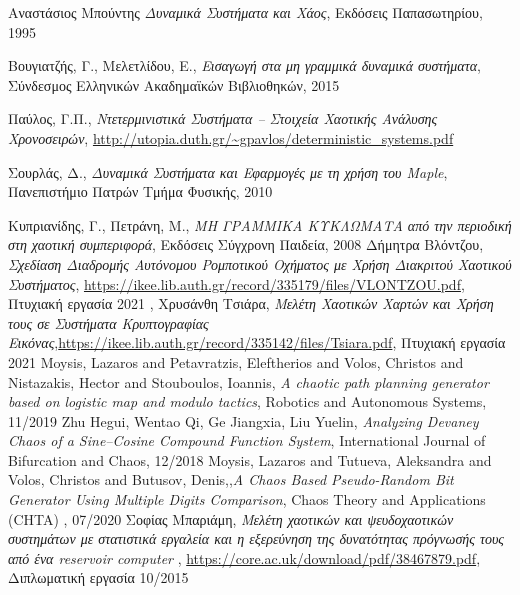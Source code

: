 
\begin{thebibliography}{9}
	Αναστάσιος Μπούντης \emph{Δυναμικά Συστήματα και Χάος}, Εκδόσεις Παπασωτηρίου, 1995
	
	Βουγιατζής, Γ., Μελετλίδου, Ε.,\emph{ Εισαγωγή στα μη γραμμικά δυναμικά συστήματα}, Σύνδεσμος
	Ελληνικών Ακαδημαϊκών Βιβλιοθηκών, 2015
	
	Παύλος, Γ.Π., \emph{Ντετερμινιστικά Συστήματα – Στοιχεία Χαοτικής Ανάλυσης Χρονοσειρών}, 
	\url{http://utopia.duth.gr/~gpavlos/deterministic_systems.pdf}
	
	Σουρλάς, Δ., \emph{Δυναμικά Συστήματα και Εφαρμογές με τη χρήση του Maple}, Πανεπιστήμιο Πατρών Τμήμα Φυσικής, 2010
	
	Κυπριανίδης, Γ., Πετράνη, Μ., \emph{ΜΗ ΓΡΑΜΜΙΚΑ ΚΥΚΛΩΜΑΤΑ από την περιοδική στη χαοτική συμπεριφορά}, Εκδόσεις Σύγχρονη Παιδεία, 2008
	Δήμητρα Βλόντζου, \emph{Σχεδίαση Διαδρομής Αυτόνομου Ρομποτικού Οχήματος με Χρήση Διακριτού Χαοτικού Συστήματος}, \url{https://ikee.lib.auth.gr/record/335179/files/VLONTZOU.pdf}, Πτυχιακή εργασία 2021
	, 
	Χρυσάνθη Τσιάρα, \emph{Μελέτη Χαοτικών Χαρτών και Χρήση τους σε
		Συστήματα Κρυπτογραφίας Εικόνας},\url{https://ikee.lib.auth.gr/record/335142/files/Tsiara.pdf}, Πτυχιακή εργασία 2021
	Moysis, Lazaros and Petavratzis, Eleftherios and Volos, Christos and Nistazakis, Hector and Stouboulos, Ioannis, \emph{A chaotic path planning generator based on logistic map and modulo tactics}, Robotics and Autonomous Systems, 11/2019
	Zhu Hegui, Wentao Qi, Ge Jiangxia, Liu Yuelin, \emph{Analyzing Devaney Chaos of a Sine–Cosine Compound Function System}, International Journal of Bifurcation and Chaos, 12/2018
	Moysis, Lazaros and Tutueva, Aleksandra and Volos, Christos and Butusov, Denis,,\emph{A Chaos Based Pseudo-Random Bit Generator Using
		Multiple Digits Comparison}, Chaos Theory and Applications (CHTA) , 07/2020
	Σοφίας Μπαριάμη, \emph{Μελέτη χαοτικών και ψευδοχαοτικών συστημάτων με
		στατιστικά εργαλεία και η εξερεύνηση της δυνατότητας
		πρόγνωσής τους από ένα reservoir computer} , \url{https://core.ac.uk/download/pdf/38467879.pdf}, Διπλωματική εργασία 10/2015
\end{thebibliography}


\clearpage